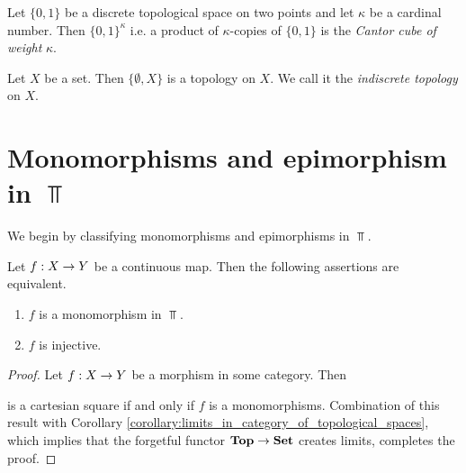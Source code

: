 \begin{example}\label{example:Cantor_space}
	Let $\{0,1\}$ be a discrete topological space on two points and let $\kappa$ be a cardinal number. Then $\{0,1\}^{\kappa}$ i.e. a product of $\kappa$-copies of $\{0,1\}$ is the \textit{Cantor cube of weight} $\kappa$.
\end{example}

\begin{example}\label{example:indiscrete_topology}
	Let $X$ be a set. Then $\{\emptyset, X\}$ is a topology on $X$. We call it the \textit{indiscrete topology} on $X$.
\end{example}

\section{Monomorphisms and epimorphism in $\Top$}
\noindent
We begin by classifying monomorphisms and epimorphisms in $\Top$.

\begin{proposition}\label{proposition:monomorphisms_in_topological_spaces}
	Let $f:X\rightarrow Y$ be a continuous map. Then the following assertions are equivalent.
	\begin{enumerate}[label=\emph{\textbf{(\roman*)}}, leftmargin=3.0em]
		\item $f$ is a monomorphism in $\Top$.
		\item $f$ is injective.
	\end{enumerate}
\end{proposition}
\begin{proof}
	Let $f:X\rightarrow Y$ be a morphism in some category. Then
	\begin{center}
	\end{center}
	is a cartesian square if and only if $f$ is a monomorphisms. Combination of this result with Corollary \ref{corollary:limits_in_category_of_topological_spaces}, which implies that the forgetful functor $\mathbf{Top} \rightarrow \mathbf{Set}$ creates limits, completes the proof.
\end{proof}

